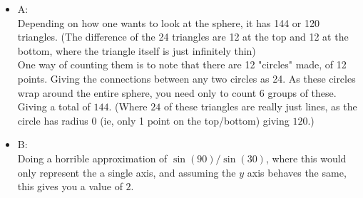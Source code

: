 \begin{itemize}

\item A: \\
Depending on how one wants to look at the sphere, it has 144 or 120 triangles. (The difference of the 24 triangles are 12 at the top and 12 at the bottom, where the triangle itself is just infinitely thin) \\

One way of counting them is to note that there are 12 "circles" made, of 12 points. Giving the connections between any two circles as 24. As these circles wrap around the entire sphere, you need only to count 6 groups of these. Giving a total of $144$. (Where $24$ of these triangles are really just lines, as the circle has radius 0 (ie, only 1 point on the top/bottom) giving $120$.) \\

\item B: \\
Doing a horrible approximation of $\sin(90)/\sin(30)$, where this would only represent the a single axis, and assuming the $y$ axis behaves the same, this gives you a value of $2$. \\

\end{itemize}
